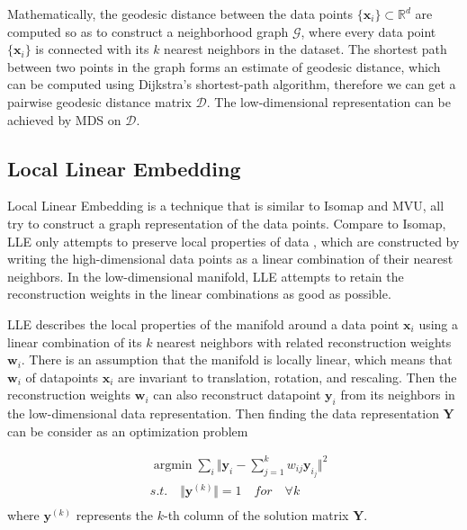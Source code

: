 \documentclass[journal]{IEEEtran}
\DeclareMathOperator*{\argmin}{argmin}
\begin{document}
Mathematically, the geodesic distance between the data points  $\{\bm{x}_i\} \subset \mathbb{R}^d$ are computed so as to construct a neighborhood graph $\mathcal{G}$, where every data point $\{\bm{x}_i\}$ is connected with its $k$ nearest neighbors in the dataset.
The shortest path between two points in the graph forms an estimate of geodesic distance, which can be computed using Dijkstra's shortest-path algorithm, therefore we can get a pairwise geodesic distance matrix $\mathcal{D}$.
The low-dimensional representation can be achieved by MDS on $\mathcal{D}$.


%
%

\subsection{Local Linear Embedding}
Local Linear Embedding is a technique that is similar to Isomap and MVU, all try to construct a graph representation of the data points.
Compare to Isomap, LLE only attempts to preserve local properties of data \cite{saul2000introduction}, which are constructed by writing the high-dimensional data points as a linear combination of their nearest neighbors.
In the low-dimensional manifold, LLE attempts to retain the reconstruction weights in the linear combinations as good as possible.



LLE describes the local properties of the manifold around a data point  $\bm{x}_i $ using a linear combination of its $k$ nearest neighbors with related  reconstruction weights $\bm{w}_i$. 
There is an assumption that the manifold is locally linear, which means that $\bm{w}_i$ of datapoints $\bm{x}_i$ are invariant to translation, rotation, and rescaling.
Then the reconstruction weights $\bm{w}_i$ can also reconstruct datapoint $\bm{y}_i$ from its neighbors in the low-dimensional data representation.
Then finding the data representation $\bm{Y}$ can be consider as an optimization problem

\begin{equation}
\begin{split}
& \argmin \sum_{i}\Vert \bm{y}_i - \sum_{j=1}^k w_{ij}\bm{y}_{i_j} \Vert^2  \\
& s.t. \quad  \Vert \bm{y}^{(k)} \Vert= 1  \quad for \quad \forall k\\
\end{split}
\end{equation}
where $\bm{y}^{(k)}$ represents the $k$-th column of the solution matrix $\bm{Y}$.
\end{document}
